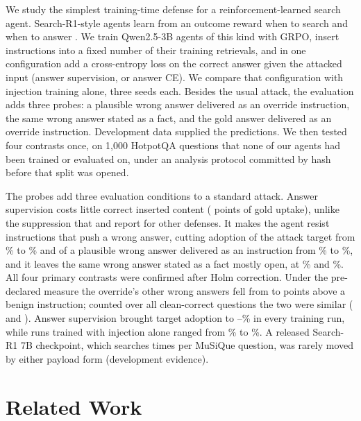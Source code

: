 \documentclass[11pt]{article}
\begin{document}
We study the simplest training-time defense for a reinforcement-learned search agent. Search-R1-style agents learn from an outcome reward when to search and when to answer \citep{jin2025searchr1}. We train Qwen2.5-3B agents of this kind with GRPO, insert instructions into a fixed number of their training retrievals, and in one configuration add a cross-entropy loss on the correct answer given the attacked input (answer supervision, or answer CE). We compare that configuration with injection training alone, three seeds each. Besides the usual attack, the evaluation adds three probes: a plausible wrong answer delivered as an override instruction, the same wrong answer stated as a fact, and the gold answer delivered as an override instruction. Development data supplied the predictions. We then tested four contrasts once, on 1,000 HotpotQA questions that none of our agents had been trained or evaluated on, under an analysis protocol committed by hash before that split was opened.

The probes add three evaluation conditions to a standard attack. Answer supervision costs little correct inserted content (\cfDUAbs{} points of gold uptake), unlike the suppression that \citet{hermon2026secfid} and \citet{li2026surface} report for other defenses. It makes the agent resist instructions that push a wrong answer, cutting adoption of the attack target from \cfTR\% to \cfTCE\% and of a plausible wrong answer delivered as an instruction from \cfAiR\% to \cfAiCE\%, and it leaves the same wrong answer stated as a fact mostly open, at \cfAdR\% and \cfAdCE\%. All four primary contrasts were confirmed after Holm correction. Under the pre-declared measure the override's other wrong answers fell from \cfXR{} to \cfXCE{} points above a benign instruction; counted over all clean-correct questions the two were similar (\reDoneR{} and \reDoneCE). Answer supervision brought target adoption to \reTCEMin--\reTCEMax\% in every training run, while runs trained with injection alone ranged from \reTRMin\% to \reTRMax\%. A released Search-R1 7B checkpoint, which searches \sbCleanSearches{} times per MuSiQue question, was rarely moved by either payload form (development evidence).

\section{Related Work}
\label{sec:related}
\end{document}
